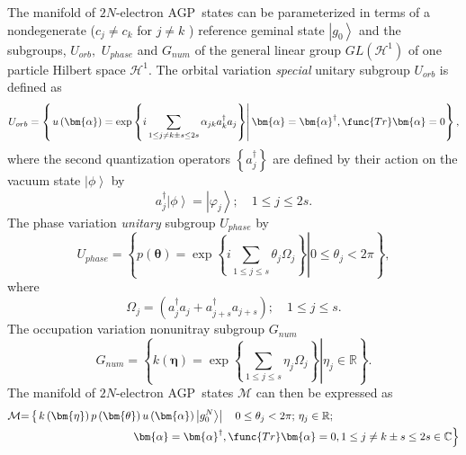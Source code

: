 \documentclass{preprint}
\begin{document}
The manifold of $2N$-electron AGP\ states can be parameterized in terms of a
nondegenerate ($c_{j}\neq c_{k}$ for $j\neq k$ ) reference geminal state $%
\left\vert g_{0}\right\rangle $ and the subgroups, $U_{orb},$ $U_{phase}$
and $G_{num}$ of the general linear group $GL\left( \mathcal{H}^{1}\right) $
of one particle Hilbert space $\mathcal{H}^{1}$. The orbital variation \emph{%
special} unitary subgroup $U_{orb}$ is defined as
\begin{equation}
U_{orb}=\left\{ \left. u\left( \bm{\alpha}\right) =\exp \left\{ i\sum_{1\leq
j\neq k\pm s\leq 2s}\alpha _{jk}a_{k}^{\dagger }a_{j}\right\} \right\vert %
\bm{\alpha}=\bm{\alpha}^{\dagger },\func{Tr}\bm{\alpha}=0\right\} ,
\label{orb}
\end{equation}%
where the second quantization operators $\left\{ a_{j}^{\dagger }\right\} $
are defined by their action on the vacuum state $\left\vert \phi
\right\rangle $ by
\begin{equation}
a_{j}^{\dagger }\left\vert \phi \right\rangle =\left\vert \varphi
_{j}\right\rangle ;\quad 1\leq j\leq 2s.
\end{equation}%
The phase variation \emph{unitary} subgroup $U_{phase}$ by%
\begin{equation}
U_{phase}=\left\{ \left. p\left( \bm{\theta}\right) =\exp \left\{
i\sum_{1\leq j\leq s}\theta _{j}\Omega _{j}\right\} \right\vert 0\leq \theta
_{j}<2\pi \right\} ,  \label{phase}
\end{equation}%
where
\begin{equation}
\Omega _{j}=\left( a_{j}^{\dagger }a_{j}+a_{j+s}^{\dagger }a_{j+s}\right)
;\quad 1\leq j\leq s.
\end{equation}%
The occupation variation nonunitray subgroup $G_{num}$
\begin{equation}
G_{num}=\left\{ \left. k\left( \bm{\eta}\right) =\exp \left\{ \sum_{1\leq
j\leq s}\eta _{j}\Omega _{j}\right\} \right\vert \eta _{j}\in \mathbb{R}%
\right\} .  \label{occup}
\end{equation}%
The manifold of $2N$-electron AGP\ states $\mathcal{M}$ can then be
expressed as
\begin{align}
\mathcal{M}& \mathcal{=}\left\{ \left. k\left( \bm{\eta}\right) p\left( %
\bm{\theta}\right) u\left( \bm{\alpha}\right) \left\vert
g_{0}^{N}\right\rangle \right\vert \quad 0\leq \theta _{j}<2\pi ;\,\eta
_{j}\in \mathbb{R};\right.  \notag \\
& \qquad \qquad \qquad \qquad \qquad \left. \bm{\alpha}=\bm{\alpha }%
^{\dagger },\func{Tr}\bm{\alpha}=0,1\leq j\neq k\pm s\leq 2s\in \mathbb{C}%
\right\}
\end{align}%
\end{document}
